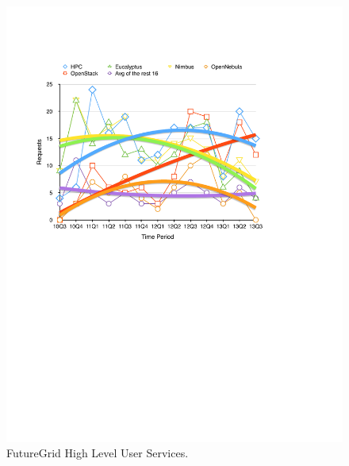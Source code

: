 \documentclass{article}
\begin{document}
\begin{figure}[htb]
  \caption{FutureGrid High Level User Services.}
  \centering
    \includegraphics[width=1.0\textwidth]{images/fg-iaas-trend.pdf}
\end{figure}
\end{document}
